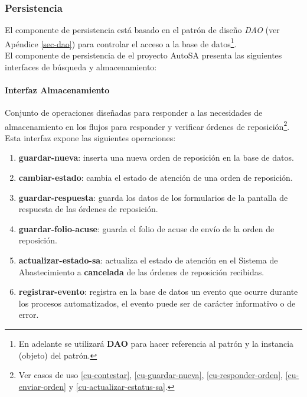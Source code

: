 \subsubsection{Persistencia}
El componente de persistencia está basado en el patrón de diseño \textit{DAO} (ver Apéndice \ref{sec-dao}) para controlar el acceso a la base de datos\footnote{En adelante se utilizará \textbf{DAO} para hacer referencia al patrón y la instancia (objeto) del patrón.}.\\
El componente de persistencia de el proyecto AutoSA presenta las siguientes interfaces de búsqueda y almacenamiento:
\paragraph{Interfaz Almacenamiento\\}
Conjunto de operaciones diseñadas para responder a las necesidades de almacenamiento en los flujos para responder y verificar órdenes de reposición\footnote{Ver casos de uso \ref{cu-contestar}, \ref{cu-guardar-nueva}, \ref{cu-responder-orden}, \ref{cu-enviar-orden} y \ref{cu-actualizar-estatus-sa}.}. Esta interfaz expone las siguientes operaciones:
\begin{enumerate}
	\item \textbf{guardar-nueva}: inserta una nueva orden de reposición en la base de datos.
	\item \textbf{cambiar-estado}: cambia el estado de atención de una orden de reposición.
	\item \textbf{guardar-respuesta}: guarda los datos de los formularios de la pantalla de respuesta de las órdenes de reposición.
	\item \textbf{guardar-folio-acuse}: guarda el folio de acuse de envío de la orden de reposición.
	\item \textbf{actualizar-estado-sa}: actualiza el estado de atención en el Sistema de Abastecimiento a \textbf{cancelada} de las órdenes de reposición recibidas.
	\item \textbf{registrar-evento}: registra en la base de datos un evento que ocurre durante los procesos automatizados, el evento puede ser de carácter informativo o de error.
\end{enumerate}

